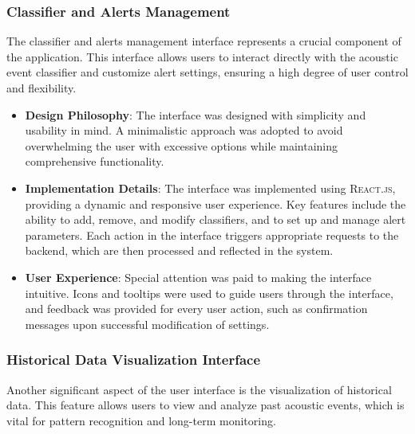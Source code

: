 \subsubsection{Classifier and Alerts Management}
The classifier and alerts management interface represents a crucial component of the application. This interface allows users to interact directly with the acoustic event classifier and customize alert settings, ensuring a high degree of user control and flexibility.
\begin{itemize}
  \item \textbf{Design Philosophy}: The interface was designed with simplicity and usability in mind. A minimalistic approach was adopted to avoid overwhelming the user with excessive options while maintaining comprehensive functionality.
  \item \textbf{Implementation Details}: The interface was implemented using \textsc{React.js}, providing a dynamic and responsive user experience. Key features include the ability to add, remove, and modify classifiers, and to set up and manage alert parameters. Each action in the interface triggers appropriate requests to the backend, which are then processed and reflected in the system.
  \item \textbf{User Experience}: Special attention was paid to making the interface intuitive. Icons and tooltips were used to guide users through the interface, and feedback was provided for every user action, such as confirmation messages upon successful modification of settings.
\end{itemize}

\subsubsection{Historical Data Visualization Interface}
Another significant aspect of the user interface is the visualization of historical data. This feature allows users to view and analyze past acoustic events, which is vital for pattern recognition and long-term monitoring.

